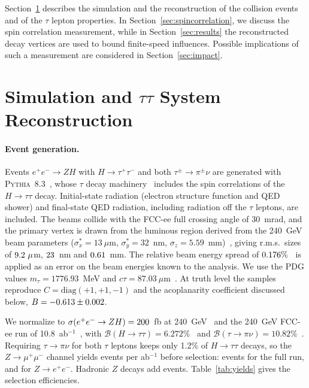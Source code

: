 \documentclass[%
 reprint,
 amsmath,amssymb,
 aps
]{revtex4-2}
\newcommand{\ee}{e^+e^-}
\begin{document}
Section~\ref{sec:taus} describes the simulation and the reconstruction of the collision events and of the $\tau$ lepton properties. In Section~\ref{sec:spincorrelation}, we discuss the spin correlation measurement, while in Section~\ref{sec:results} the reconstructed decay vertices are used to bound finite-speed influences. Possible implications of such a measurement are considered in Section~\ref{sec:impact}.

\section{Simulation and $\tau\tau$ System Reconstruction}
\label{sec:taus}

\paragraph{Event generation.} Events $\ee\to ZH$ with $H\to\tau^+\tau^-$ and both $\tau^\pm\to\pi^\pm\nu$ are generated with \textsc{Pythia}~8.3~\cite{Bierlich:2022pfr}, whose $\tau$ decay machinery~\cite{Ilten:2013yed} includes the spin correlations of the $H\to\tau\tau$ decay. Initial-state radiation (electron structure function and QED shower) and final-state QED radiation, including radiation off the $\tau$ leptons, are included. The beams collide with the FCC-ee full crossing angle of 30~mrad, and the primary vertex is drawn from the luminous region derived from the 240~GeV beam parameters ($\sigma_x^*=13~\mu$m, $\sigma_y^*=32$~nm, $\sigma_z=5.59$~mm)~\cite{FCC:2025uan}, giving r.m.s.\ sizes of $9.2~\mu$m, $23$~nm and $0.61$~mm. The relative beam energy spread of $0.176\%$~\cite{FCC:2025uan} is applied as an error on the beam energies known to the analysis. We use the PDG values $m_\tau=1776.93$~MeV and $c\tau=87.03~\mu$m~\cite{ParticleDataGroup:2024cfk}. At truth level the samples reproduce $C=\mathrm{diag}(+1,+1,-1)$ and the acoplanarity coefficient discussed below, $B=-0.613\pm0.002$.

We normalize to $\sigma(\ee\to ZH)=\numSigmaZH$~fb at 240~GeV~\cite{Li:2025kjy} and the 240~GeV FCC-ee run of 10.8~ab$^{-1}$~\cite{FCC:2025uan}, with $\mathcal{B}(H\to\tau\tau)=6.272\%$~\cite{LHCHiggsCrossSectionWorkingGroup:2016ypw} and $\mathcal{B}(\tau\to\pi\nu)=10.82\%$~\cite{ParticleDataGroup:2024cfk}. Requiring $\tau\to\pi\nu$ for both $\tau$ leptons keeps only 1.2\% of $H\to\tau\tau$ decays, so the $Z\to\mu^+\mu^-$ channel yields \numNPerAbMuMu{} events per ab$^{-1}$ before selection: \numNGenMuMu{} events for the full run, and \numNGenEE{} for $Z\to e^+e^-$. Hadronic $Z$ decays add \numNGenQQ{} events. Table~\ref{tab:yields} gives the selection efficiencies.
\end{document}
